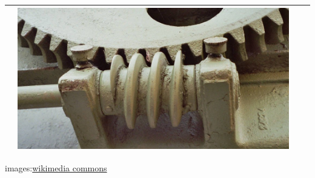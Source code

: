 \documentclass[fleqn]{beamer} %
\begin{document}
\begin{frame}[label=sectionI]
\begin{tabular}{|c|c|c|c|}
			& \includegraphics[scale=.07]{images/worm_gear.png} & & \\ \hline
		\end{tabular}

		{\tiny images:\href{https://commons.wikimedia.org/w/index.php?search=gear&title=Special:MediaSearch&go=Go&type=image}{wikimedia commons} }

	\end{frame}
\end{document}
